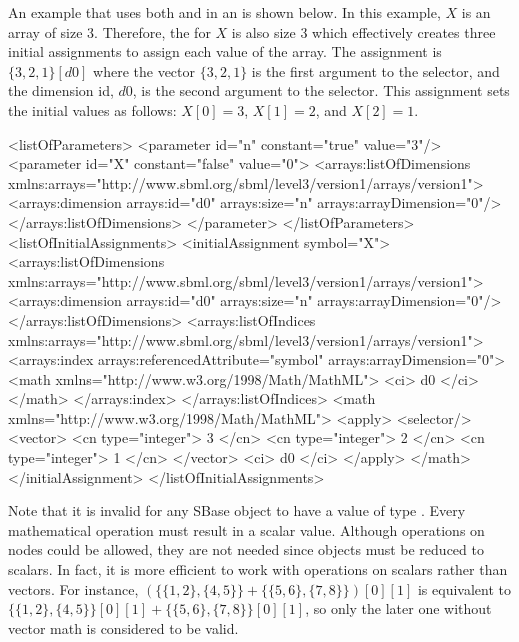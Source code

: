 An example that uses both  and  in an \InitialAssignment is shown below.   In this example, $X$ is an array of size 3.  Therefore, the \InitialAssignment for $X$ is also size 3 which effectively creates three initial assignments to assign each value of the array.  The assignment is $\{ 3, 2, 1 \}[d0]$ where the vector $\{ 3, 2, 1 \}$ is the first argument to the selector, and the \InitialAssignment dimension id, $d0$, is the second argument to the selector.  This assignment sets the initial values as follows: $X[0]=3$, $X[1]=2$, and $X[2]=1$.
\begin{example}[showstringspaces=false]
<listOfParameters>
  <parameter id="n" constant="true" value="3"/>
  <parameter id="X" constant="false" value="0">
    <arrays:listOfDimensions xmlns:arrays="http://www.sbml.org/sbml/level3/version1/arrays/version1">
      <arrays:dimension arrays:id="d0" arrays:size="n" arrays:arrayDimension="0"/>
    </arrays:listOfDimensions>
  </parameter>
</listOfParameters>
<listOfInitialAssignments>
  <initialAssignment symbol="X">
    <arrays:listOfDimensions xmlns:arrays="http://www.sbml.org/sbml/level3/version1/arrays/version1">
      <arrays:dimension arrays:id="d0" arrays:size="n" arrays:arrayDimension="0"/>
    </arrays:listOfDimensions>
    <arrays:listOfIndices xmlns:arrays="http://www.sbml.org/sbml/level3/version1/arrays/version1">
      <arrays:index arrays:referencedAttribute="symbol" arrays:arrayDimension="0">
        <math xmlns="http://www.w3.org/1998/Math/MathML">
          <ci> d0 </ci>
        </math>
      </arrays:index>
    </arrays:listOfIndices>
    <math xmlns="http://www.w3.org/1998/Math/MathML">
      <apply>
        <selector/>
        <vector>
          <cn type="integer"> 3 </cn>
          <cn type="integer"> 2 </cn>
          <cn type="integer"> 1 </cn>
        </vector>
        <ci> d0 </ci>
      </apply>
    </math>
  </initialAssignment>
</listOfInitialAssignments>
\end{example}

Note that it is invalid for any SBase object to have a value of type .  Every mathematical operation must result in a scalar value.  Although operations on  nodes could be allowed, they are not needed since  objects must be reduced to scalars.  In fact, it is more efficient to work with operations on scalars rather than vectors. For instance, $(\{\{1,2\},\{4,5\}\}+\{\{5,6\},\{7,8\}\})[0][1]$ is equivalent to $\{\{1,2\},\{4,5\}\}[0][1] + \{\{5,6\},\{7,8\}\}[0][1]$, so only the later one without vector math is considered to be valid.

